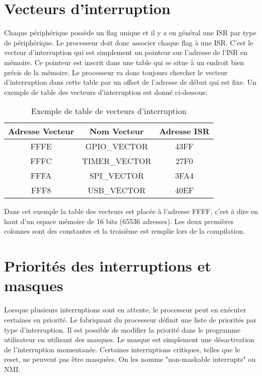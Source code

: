 \section{Vecteurs d'interruption}
Chaque périphérique possède un flag unique et il y a en général une ISR par type de périphérique. Le processeur doit donc associer chaque flag à une ISR. C'est le vecteur d'interruption qui est simplement un pointeur sur l'adresse de l'ISR en mémoire. Ce pointeur est inscrit dans une table qui se situe à un endroit bien précis de la mémoire. Le processeur va donc toujours chercher le vecteur d'interruption dans cette table par un offset de l'adresse de début qui est fixe. Un exemple de table des vecteurs d'interruption est donné ci-dessous:

\begin{table}[!htbp]
\begin{center}
{\selectfont
\begin{tabular}{|c|c|c|}
\hline 
Adresse Vecteur & Nom Vecteur & Adresse ISR\\
\hline  
\hline 
FFFE & GPIO\_VECTOR & 43FF\\
\hline 
FFFC & TIMER\_VECTOR & 27F0\\
\hline
FFFA & SPI\_VECTOR & 3FA4\\
\hline
FFF8 & USB\_VECTOR & 40EF\\
\hline
\end{tabular}
}
\end{center}
\caption{Exemple de table de vecteurs d'interruption \label{vecteurs}}
\end{table}

Dans cet exemple la table des vecteurs est placée à l'adresse FFFF, c'est à dire en haut d'un espace mémoire de 16 bits (65536 adresses). Les deux premières colonnes sont des constantes et la troisième est remplie lors de la compilation.

\section{Priorités des interruptions et masques}
Lorsque plusieurs interruptions sont en attente, le processeur peut en exécuter certaines en priorité. Le fabriquant du processeur définit une liste de priorités par type d'interruption. Il est possible de modifier la priorité dans le programme utilisateur en utilisant des masques. Le masque est simplement une désactivation de l'interruption momentanée. Certaines interruptions critiques, telles que le reset, ne peuvent pas être masquées. On les nomme "non-maskable interrupts" ou NMI.

